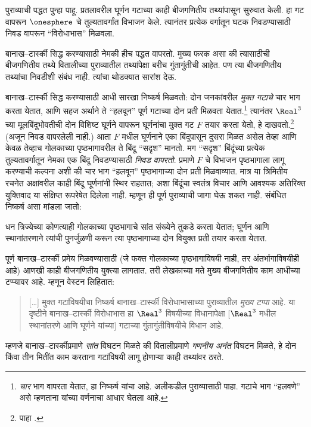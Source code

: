 \documentclass[../../../include/open-logic-section]{subfiles}
\begin{document}
पुराव्याची पद्धत पुन्हा पाहू. प्रतलावरील घूर्णन गटाच्या काही बीजगणितीय तथ्यांपासून सुरुवात केली. हा गट वापरून $\onesphere$ चे तुल्यतावर्गांत विभाजन केले. त्यानंतर प्रत्येक वर्गातून घटक निवडण्यासाठी निवड वापरून “विरोधाभास” मिळवला.

बानाख--टार्स्की सिद्ध करण्यासाठी नेमकी हीच पद्धत वापरतो. मुख्य फरक असा की त्यासाठीची बीजगणितीय तथ्ये वितालीच्या पुराव्यातील तथ्यांपेक्षा बरीच गुंतागुंतीची आहेत. पण त्या बीजगणितीय तथ्यांचा निवडीशी संबंध नाही. त्यांचा थोडक्यात सारांश देऊ.

बानाख--टार्स्की सिद्ध करण्यासाठी आधी  सारखा निष्कर्ष मिळवतो: दोन जनकांवरील \emph{मुक्त गटाचे} चार भाग करता येतात, आणि सहज अर्थाने ते “हलवून” पूर्ण गटाच्या दोन प्रती मिळवता येतात.\footnote{\emph{चार} भाग वापरता येतात, हा निष्कर्ष \cite{Robinson1947} यांचा आहे. अलीकडील पुराव्यासाठी \citet[प्रमेय 5.2]{Wagon2016} पाहा. गटाचे भाग “हलवणे” असे म्हणताना \citet[पृ.~3]{Weston2003} यांच्या वर्णनाचा आधार घेतला आहे.} त्यानंतर $\Real^3$ च्या मूलबिंदूभोवतीची दोन विशिष्ट घूर्णने वापरून घूर्णनांचा मुक्त गट $F$ तयार करता येतो, हे दाखवतो.\footnote{पाहा \citet[प्रमेय 2.1]{Wagon2016}.} (अजून निवड वापरलेली नाही.) आता $F$ मधील घूर्णनाने एका बिंदूपासून दुसरा मिळत असेल तेव्हा आणि केवळ तेव्हाच गोलकाच्या पृष्ठभागावरील ते बिंदू “सदृश” मानतो. मग “सदृश” बिंदूंच्या प्रत्येक तुल्यतावर्गातून नेमका एक बिंदू निवडण्यासाठी \emph{निवड वापरतो}.  प्रमाणे $F$ चे विभाजन पृष्ठभागाला लागू करण्याची कल्पना अशी की चार भाग “हलवून” पृष्ठभागाच्या दोन प्रती मिळवाव्यात. मात्र या त्रिमितीय रचनेत अक्षांवरील काही बिंदू घूर्णनांनी स्थिर राहतात; अशा बिंदूंचा स्वतंत्र विचार आणि आवश्यक अतिरिक्त युक्तिवाद या संक्षिप्त रूपरेषेत दिलेला नाही. म्हणून ही पूर्ण पुराव्याची जागा घेऊ शकत नाही. संबंधित निष्कर्ष \citep{Hausdorff1914} असा मांडला जातो:

\begin{thm}
धन त्रिज्येच्या कोणत्याही गोलकाच्या पृष्ठभागाचे सांत संख्येने तुकडे करता येतात; घूर्णन आणि स्थानांतरणाने त्यांची पुनर्जुळणी करून त्या पृष्ठभागाच्या दोन वियुक्त प्रती तयार करता येतात.
\end{thm}

पूर्ण बानाख--टार्स्की प्रमेय मिळवण्यासाठी (जे फक्त गोलकाच्या पृष्ठभागाविषयी नाही, तर अंतर्भागाविषयीही आहे) आणखी काही बीजगणितीय युक्त्या लागतात. तरी लेखकाच्या मते मुख्य बीजगणितीय काम आधीच्या टप्प्यावर आहे. म्हणून वेस्टन लिहितात:
\begin{quote}
  [\ldots] मुक्त गटांविषयीचा निष्कर्ष बानाख--टार्स्की विरोधाभासाच्या पुराव्यातील \emph{मुख्य टप्पा} आहे. या दृष्टीने बानाख--टार्स्की विरोधाभास हा $\Real^3$ विषयीच्या विधानापेक्षा [$\Real^3$ मधील स्थानांतरणे आणि घूर्णने यांच्या] गटाच्या गुंतागुंतीविषयीचे विधान आहे. \cite[पृ.~16]{Weston2003}
\end{quote}
म्हणजे बानाख--टार्स्कीप्रमाणे \emph{सांत} विघटन मिळते की वितालीप्रमाणे \emph{गणनीय अनंत} विघटन मिळते, हे दोन किंवा तीन मितींत काम करताना गटांविषयी लागू होणाऱ्या काही तथ्यांवर ठरते.
\end{document}
